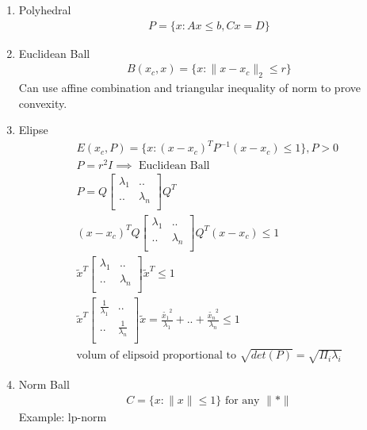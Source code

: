 \documentclass[12pt,letter]{article}
\newcommand{\norm}[1]{\|#1\|}
\begin{document}

\begin{enumerate}
\item Polyhedral
  \begin{align*}
    P=\{x: Ax \leq b, Cx=D \}
  \end{align*}

\item Euclidean Ball
  \begin{align*}
    B(x_c,x) = \{ x: \norm{x-x_c}_2 \leq r \}
  \end{align*}
  Can use affine combination and triangular inequality of norm to prove convexity.
\item Elipse
  \begin{align*}
    E(x_c,P) = \{ x: (x-x_c)^T P^{-1} (x-x_c) \leq 1 \}, P > 0\\
    P=r^2 I \implies \text{ Euclidean Ball }\\
    P=Q \begin{bmatrix}
      \lambda_1 & ..\\
      .. & \lambda_n\\
    \end{bmatrix}
    Q^T\\
    (x-x_c)^T Q \begin{bmatrix}
      \lambda_1 & ..\\
      .. & \lambda_n\\
    \end{bmatrix}
    Q^T(x-x_c) \leq 1\\
    \tilde{x}^T \begin{bmatrix}
      \lambda_1 & ..\\
      .. & \lambda_n\\
    \end{bmatrix}
    \tilde{x}^T \leq 1\\
    \tilde{x}^T \begin{bmatrix}
      \frac{1}{\lambda_1} & ..\\
      .. & \frac{1}{\lambda_n}\\
    \end{bmatrix}
    \tilde{x} = \frac{\tilde{x_1}^2}{\lambda_1}+..+\frac{\tilde{x_n}^2}{\lambda_n}\leq 1\\
    \text{volum of elipsoid proportional to } \sqrt{det(P)}=\sqrt{\Pi_i \lambda_i}
  \end{align*}
  \item Norm Ball
  \begin{align*}
    C=\{x: \norm{x} \leq 1 \} \text{ for any } \norm{*}
  \end{align*}
  Example: lp-norm\\
  

\end{enumerate}
\end{document}
